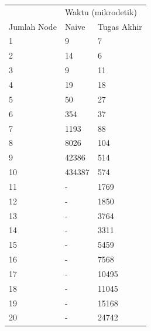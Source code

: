 \begin{table}[ht!]
	\centering
	\begin{tabularx}{0.6\textwidth}{|l|l|X|}
	\hline
								 & \multicolumn{2}{l|}{Waktu (mikrodetik)} \\ \cline{2-3} 
	Jumlah Node					 & Naive          & Tugas Akhir       \\ \hline
	1                            & 9       		  & 7                 \\ \hline
	2                            & 14       	  & 6       	      \\ \hline
	3                            & 9       		  & 11          	  \\ \hline
	4                            & 19       	  & 18     		      \\ \hline
	5                            & 50       	  & 27          	  \\ \hline
	6                            & 354       	  & 37     	          \\ \hline
	7                            & 1193       	  & 88        	      \\ \hline
	8                            & 8026           & 104          	  \\ \hline
	9                            & 42386          & 514          	  \\ \hline
	10                           & 434387         & 574          	  \\ \hline
	11                           & -     	      & 1769          	  \\ \hline
	12                           & -        	  & 1850          	  \\ \hline
	13                           & -        	  & 3764          	  \\ \hline
	14                           & -       		  & 3311          	  \\ \hline
	15                           & -       		  & 5459          	  \\ \hline
	16                           & -              & 7568          	  \\ \hline
	17                           & -         	  & 10495          	  \\ \hline
	18                           & -     	      & 11045          	  \\ \hline
	19                           & -         	  & 15168          	  \\ \hline
	20                           & -         	  & 24742          	  \\ \hline

\end{tabularx}
\end{table}
